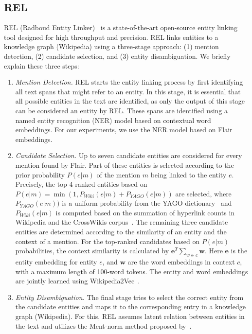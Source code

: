 \subsection{REL}
REL (Radboud Entity Linker)~\citep{REL} is a state-of-the-art open-source entity linking tool designed for high throughput and precision. REL links entities to a knowledge graph (Wikipedia) using a three-stage approach: (1) mention detection, (2) candidate selection, and (3) entity disambiguation. We briefly explain these three steps:
\begin{enumerate}
	\item \emph{Mention Detection.} REL starts the entity linking process by first identifying all text spans that might refer to an entity. In this stage, it is essential that all possible entities in the text are identified, as only the output of this stage can be considered an entity by REL. These spans are identified using a named entity recognition (NER) model based on contextual word embeddings. For our experiments, we use the NER model based on Flair embeddings. 
	\item \emph{Candidate Selection.} Up to seven candidate entities are considered for every mention found by Flair. Part of these entities is selected according to the prior probability $P(e|m)$ of the mention $m$ being linked to the entity $e$. Precisely, the top-4 ranked entities based on $P(e|m) = \min(1, P_{\mathit{Wiki}}(e|m) + P_{\mathit{YAGO}}(e|m))$ are selected, where $P_{\mathit{YAGO}}(e|m))$ is a uniform probability from the YAGO dictionary~\citep{yago} and $P_{\mathit{Wiki}}(e|m)$ is computed based on the summation of hyperlink counts in Wikipedia and the CrossWikis corpus~\citep{crosswiki}.
	The remaining three candidate entities are determined according to the similarity of an entity and the context of a mention. For the top-ranked candidates based on $P(e|m)$ probabilities, the context similarity is calculated by $\mathbf{e}^T \sum_{w\in c}\mathbf{w}$. Here $\mathbf{e}$ is the entity embedding for entity $e$, and $\mathbf{w}$ are the word embeddings in context $c$, with a maximum length of 100-word tokens. The entity and word embeddings are jointly learned using Wikipedia2Vec~\citep{wikipedia2vec}. 
	\item \emph{Entity Disambiguation.} The final stage tries to select the correct entity from the candidate entities and maps it to the corresponding entry in a knowledge graph (Wikipedia). For this, REL assumes latent relation between entities in the text and utilizes the Ment-norm method proposed by~\citet{ED-paper}.
\end{enumerate}

